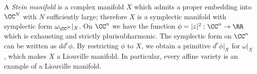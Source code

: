 

    A \emph{Stein manifold} is a complex manifold $X$ which admits a proper embedding into $\CC^N$ with $N$ sufficiently large; therefore $X$ is a symplectic manifold with symplectic form $\omega_{\CC^N}|_X$. 
    On $\CC^n$ we have the function $\phi=|z|^2:\CC^n\to \RR$ which is exhausting and strictly plurisubharmonic. The symplectic form on $\CC^n$ can be written as $dd^c\phi$. By restricting $\phi$ to $X$, we obtain a primitive $d^c\phi|_X$ for $\omega|_X$, which makes $X$ a Liouville manifold. In particular, every affine variety is an example of a Liouville manifold.
    \label{exm:steinDomain}


